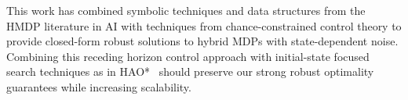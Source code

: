 \documentclass[letterpaper]{article}
\begin{document}
%
%

This work has combined symbolic techniques and data structures from
the HMDP literature in AI with techniques from chance-constrained
control theory to provide closed-form robust solutions to hybrid MDPs
with state-dependent noise.
Combining this receding
horizon control approach with initial-state focused search techniques as in
HAO*~\cite{hao09} should preserve our strong robust optimality
guarantees while increasing scalability.
\end{document}
